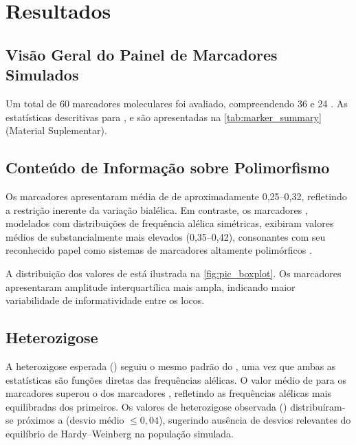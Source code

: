 
\section{Resultados}
\label{sec:results}

\subsection{Visão Geral do Painel de Marcadores Simulados}

Um total de 60 marcadores moleculares foi avaliado, compreendendo 36 \snp{} e
24 \ssr{}. As estatísticas descritivas para \pic{}, \he{} e \ho{} são
apresentadas na \cref{tab:marker_summary} (Material Suplementar).

\subsection{Conteúdo de Informação sobre Polimorfismo}

Os marcadores \snp{} apresentaram média de \pic{} de aproximadamente
0,25--0,32, refletindo a restrição inerente da variação bialélica. Em
contraste, os marcadores \ssr{}, modelados com distribuições de frequência
alélica simétricas, exibiram valores médios de \pic{} substancialmente mais
elevados (0,35--0,42), consonantes com seu reconhecido papel como sistemas
de marcadores altamente polimórficos \autocite{Powell1996}.

A distribuição dos valores de \pic{} está ilustrada na
\cref{fig:pic_boxplot}. Os marcadores \ssr{} apresentaram amplitude
interquartílica mais ampla, indicando maior variabilidade de informatividade
entre os locos.

\subsection{Heterozigose}

A heterozigose esperada (\he{}) seguiu o mesmo padrão do \pic{}, uma vez que
ambas as estatísticas são funções diretas das frequências alélicas. O valor
médio de \he{} para os marcadores \ssr{} superou o dos marcadores \snp{},
refletindo as frequências alélicas mais equilibradas dos primeiros. Os
valores de heterozigose observada (\ho{}) distribuíram-se próximos a
\he{} (desvio médio $\leq 0,04$), sugerindo ausência de desvios
relevantes do equilíbrio de Hardy--Weinberg na população simulada.
